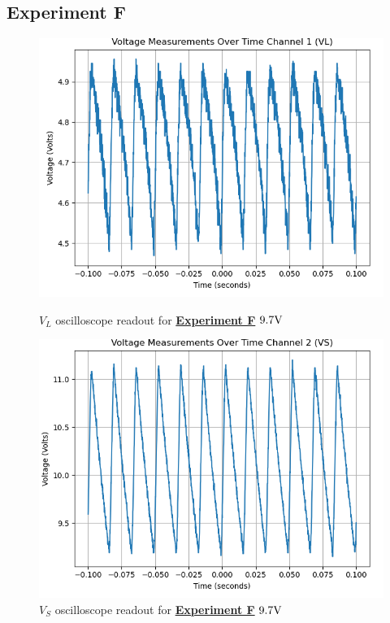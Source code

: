 \documentclass[
	letterpaper
	12pt
]{template}
\newcommand{\bref}[2]{\textbf{\hyperref[#1]{#2}}}
\begin{document}
\subsection{Experiment F}
\begin{figure}[H]\label{data::F}
	\centering
	\begin{minipage}[c]{0.45\textwidth}
		\centering
		\includegraphics[width=\textwidth]{figures/F/1--ch1.png}
	    \caption{$V_{L}$ oscilloscope readout for \bref{exp::F}{Experiment F} $9.7\unit V$ }
	\end{minipage}
	\hfill
	\begin{minipage}[c]{0.45\textwidth}
		\centering
		\includegraphics[width=\textwidth]{figures/F/1--ch2.png}
	    \caption{$V_{S}$ oscilloscope readout for \bref{exp::F}{Experiment F} $9.7\unit V$ }
	\end{minipage}
\end{figure}
\end{document}
